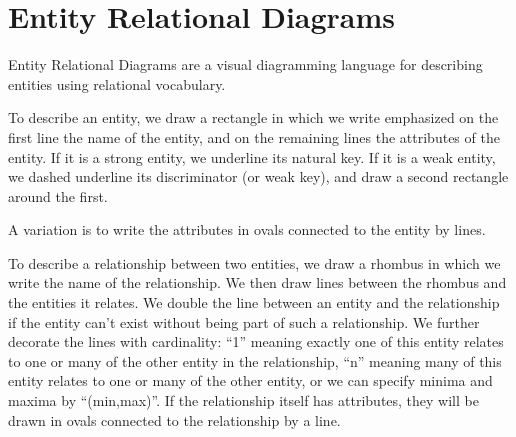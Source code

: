 \chapter{Entity Relational Diagrams}

Entity Relational Diagrams are a visual diagramming language for
describing entities using relational vocabulary.

To describe an entity, we draw a rectangle in which we write
emphasized on the first line the name of the entity, and on the
remaining lines the attributes of the entity.  If it is a strong
entity, we underline its natural key.  If it is a weak entity, we
dashed underline its discriminator (or weak key), and draw a second
rectangle around the first.

A variation is to write the attributes in ovals connected to the
entity by lines.

To describe a relationship between two entities, we draw a rhombus in
which we write the name of the relationship.  We then draw lines
between the rhombus and the entities it relates.  We double the line
between an entity and the relationship if the entity can't exist
without being part of such a relationship.  We further decorate the
lines with cardinality: ``1'' meaning exactly one of this entity
relates to one or many of the other entity in the relationship, ``n''
meaning many of this entity relates to one or many of the other
entity, or we can specify minima and maxima by ``(min,max)''.  If the
relationship itself has attributes, they will be drawn in ovals
connected to the relationship by a line.
